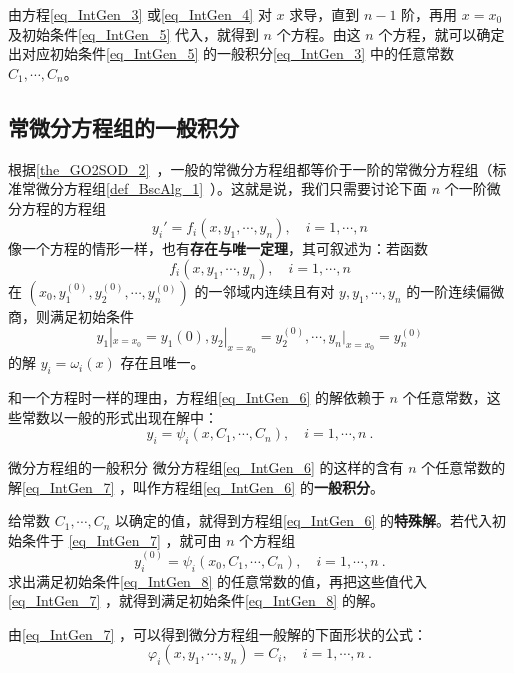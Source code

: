 由方程\autoref{eq_IntGen_3} 或\autoref{eq_IntGen_4} 对 $x$ 求导，直到 $n-1$ 阶，再用 $x=x_0$ 及初始条件\autoref{eq_IntGen_5} 代入，就得到 $n$ 个方程。由这 $n$ 个方程，就可以确定出对应初始条件\autoref{eq_IntGen_5} 的一般积分\autoref{eq_IntGen_3} 中的任意常数 $C_1,\cdots,C_n$。
\subsection{常微分方程组的一般积分}
根据\autoref{the_GO2SOD_2}~，一般的常微分方程组都等价于一阶的常微分方程组（标准常微分方程组\autoref{def_BscAlg_1}~）。这就是说，我们只需要讨论下面 $n$ 个一阶微分方程的方程组
\begin{equation}\label{eq_IntGen_6}
y_i'=f_i(x,y_1,\cdots,y_n),\quad i=1,\cdots,n
\end{equation}
像一个方程的情形一样，也有\textbf{存在与唯一定理}，其可叙述为：若函数
\begin{equation}
f_i(x,y_1,\cdots,y_n),\quad i=1,\cdots,n
\end{equation}
在 $(x_0,y_1^{(0)},y_2^{(0)},\cdots,y_n^{(0)})$ 的一邻域内连续且有对 $y,y_1,\cdots,y_n$ 的一阶连续偏微商，则满足初始条件
\begin{equation}\label{eq_IntGen_8}
y_1|_{x=x_0}=y_1{(0)},y_2|_{x=x_0}=y_2^{(0)},\cdots,y_n|_{x=x_0}=y_n^{(0)}
\end{equation}
的解 $y_i=\omega_i(x)$ 存在且唯一。

和一个方程时一样的理由，方程组\autoref{eq_IntGen_6} 的解依赖于 $n$ 个任意常数，这些常数以一般的形式出现在解中：
\begin{equation}\label{eq_IntGen_7}
y_i=\psi_i(x,C_1,\cdots,C_n),\quad i=1,\cdots,n~.
\end{equation}
\begin{definition}{微分方程组的一般积分}
微分方程组\autoref{eq_IntGen_6} 的这样的含有 $n$ 个任意常数的解\autoref{eq_IntGen_7} ，叫作方程组\autoref{eq_IntGen_6} 的\textbf{一般积分}。
\end{definition}
给常数 $C_1,\cdots,C_n$ 以确定的值，就得到方程组\autoref{eq_IntGen_6} 的\textbf{特殊解}。若代入初始条件于 \autoref{eq_IntGen_7} ，就可由 $n$ 个方程组
\begin{equation}
y_i^{(0)}=\psi_i(x_0,C_1,\cdots,C_n),\quad i=1,\cdots,n~.
\end{equation}
求出满足初始条件\autoref{eq_IntGen_8} 的任意常数的值，再把这些值代入\autoref{eq_IntGen_7} ，就得到满足初始条件\autoref{eq_IntGen_8} 的解。

由\autoref{eq_IntGen_7} ，可以得到微分方程组一般解的下面形状的公式：
\begin{equation}\label{eq_IntGen_9}
\varphi_i(x,y_1,\cdots,y_n)=C_i,\quad i=1,\cdots,n~.
\end{equation}

